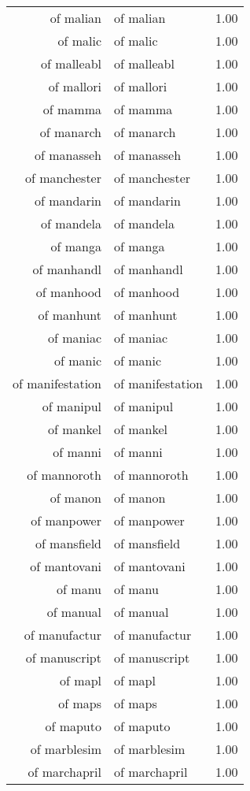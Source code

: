 \begin{table}[ht]
\begin{tabular}{rlr}
  of malian & of malian & 1.00 \\ 
  of malic & of malic & 1.00 \\ 
  of malleabl & of malleabl & 1.00 \\ 
  of mallori & of mallori & 1.00 \\ 
  of mamma & of mamma & 1.00 \\ 
  of manarch & of manarch & 1.00 \\ 
  of manasseh & of manasseh & 1.00 \\ 
  of manchester & of manchester & 1.00 \\ 
  of mandarin & of mandarin & 1.00 \\ 
  of mandela & of mandela & 1.00 \\ 
  of manga & of manga & 1.00 \\ 
  of manhandl & of manhandl & 1.00 \\ 
  of manhood & of manhood & 1.00 \\ 
  of manhunt & of manhunt & 1.00 \\ 
  of maniac & of maniac & 1.00 \\ 
  of manic & of manic & 1.00 \\ 
  of manifestation & of manifestation & 1.00 \\ 
  of manipul & of manipul & 1.00 \\ 
  of mankel & of mankel & 1.00 \\ 
  of manni & of manni & 1.00 \\ 
  of mannoroth & of mannoroth & 1.00 \\ 
  of manon & of manon & 1.00 \\ 
  of manpower & of manpower & 1.00 \\ 
  of mansfield & of mansfield & 1.00 \\ 
  of mantovani & of mantovani & 1.00 \\ 
  of manu & of manu & 1.00 \\ 
  of manual & of manual & 1.00 \\ 
  of manufactur & of manufactur & 1.00 \\ 
  of manuscript & of manuscript & 1.00 \\ 
  of mapl & of mapl & 1.00 \\ 
  of maps & of maps & 1.00 \\ 
  of maputo & of maputo & 1.00 \\ 
  of marblesim & of marblesim & 1.00 \\ 
  of marchapril & of marchapril & 1.00 \\ 

\end{tabular}
\end{table}
